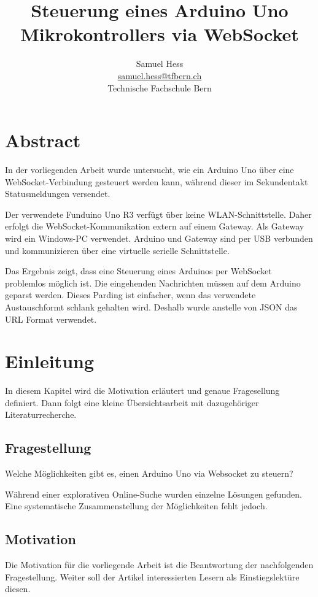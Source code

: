 
\subject{ICT Modul 121 -- Steuerungsaufgaben bearbeiten}
\title{Steuerung eines Arduino Uno Mikrokontrollers via WebSocket}
\subtitle{}
\author{Samuel Hess \\ 
\href{mailto:samuel.hess@tfbern.ch}{samuel.hess@tfbern.ch} \\ 
Technische Fachschule Bern}


\maketitle

\newpage
\tableofcontents
\newpage

\section{Abstract}
In der vorliegenden Arbeit wurde untersucht, wie ein Arduino Uno über eine WebSocket-Verbindung gesteuert werden kann, während dieser im Sekundentakt Statusmeldungen versendet.

Der verwendete Funduino Uno R3 \cite{lernset} verfügt über keine WLAN-Schnittstelle. Daher erfolgt die WebSocket-Kommunikation extern auf einem Gateway. Als Gateway wird ein Windows-PC verwendet. Arduino und Gateway sind per USB verbunden und kommunizieren über eine virtuelle serielle
Schnittstelle.

Das Ergebnis zeigt, dass eine Steuerung eines Arduinos per WebSocket problemlos möglich ist.  Die eingehenden Nachrichten müssen auf dem Arduino geparst werden. Dieses Parding ist einfacher, wenn das verwendete Austauschformt schlank gehalten wird. Deshalb wurde anstelle von JSON das URL Format verwendet.

\section{Einleitung}
In diesem Kapitel wird die Motivation erläutert und genaue Fragesellung definiert. Dann folgt eine kleine Übersichtsarbeit mit dazugehöriger Literaturrecherche.  
\subsection{Fragestellung}
Welche Möglichkeiten gibt es, einen Arduino Uno via Websocket zu steuern?

Während einer explorativen Online-Suche wurden einzelne Lösungen gefunden. Eine systematische Zusammenstellung der Möglichkeiten fehlt jedoch.
\subsection{Motivation}
Die Motivation für die vorliegende Arbeit ist die Beantwortung der nachfolgenden Fragestellung.
Weiter soll der Artikel interessierten Lesern als Einstiegslektüre diesen.

